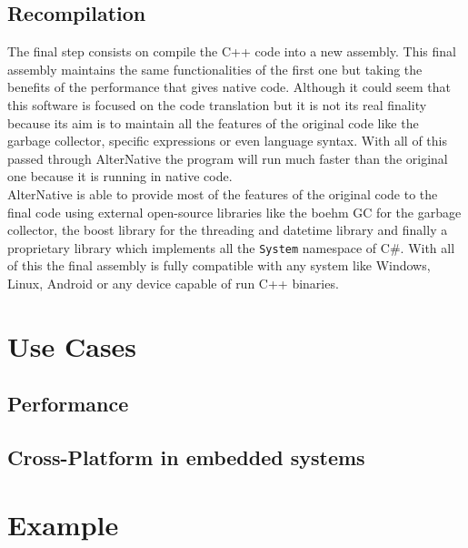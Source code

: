 \subsection{Recompilation}\label{SS:AN-Process-Recompilation}
The final step consists on compile the C++ code into a new assembly. This final assembly maintains the same functionalities of the first one but taking the benefits of the performance that gives native code. Although it could seem that this software is focused on the code translation but it is not its real finality because its aim is to maintain all the features of the original code like the garbage collector, specific expressions or even language syntax. With all of this passed through AlterNative the program will run much faster than the original one because it is running in native code.
\\
AlterNative is able to provide most of the features of the original code to the final code using external open-source libraries like the boehm GC for the garbage collector, the boost library for the threading and datetime library and finally a proprietary library which implements all the \verb!System! namespace of C\#. With all of this the final assembly is fully compatible with any system like Windows, Linux, Android or any device capable of run C++ binaries.

\section{Use Cases}\label{S:AN-Use-Cases}
\subsection{Performance}\label{SS:AN-Use-Cases-Perf}
\subsection{Cross-Platform in embedded systems}\label{SS:AN-Use-Cases-NETMF}
\section{Example}\label{SS:AN-Process-Example}